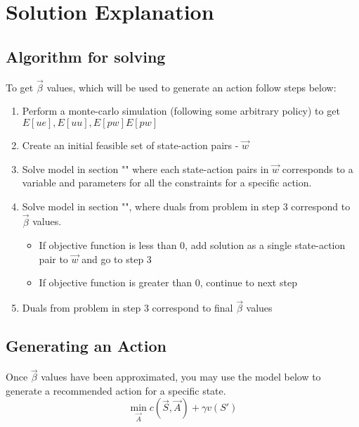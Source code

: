 \section{Solution Explanation}
\subsection{Algorithm for solving}
To get $\vec{\beta}$ values, which will be used to generate an action follow steps below:
\begin{enumerate}
	\item Perform a monte-carlo simulation (following some arbitrary policy) to get $E[ue], E[uu], E[pw] E[pw]$
	\item Create an initial feasible set of state-action pairs - $\vec{w}$
	\item Solve model in section "" where each state-action pairs in $\vec{w}$ corresponds to a variable and parameters for all the constraints for a specific action.
	\item Solve model in section "", where duals from problem in step 3  correspond to $\vec{\beta}$ values. 
	\begin{itemize}
		\item If objective function is less than 0, add solution as a single state-action pair to $\vec{w}$ and go to step 3
		\item If objective function is greater than 0, continue to next step
	\end{itemize}
	\item Duals from problem in step 3 correspond to final $\vec{\beta}$ values
\end{enumerate}

\subsection{Generating an Action}
Once $\vec{\beta}$ values have been approximated, you may use the model below to generate a recommended action for a specific state.
\begin{equation*}
	\min_{\vec{A}} c(\vec{S}, \vec{A}) + \gamma v(S')
\end{equation*}	

